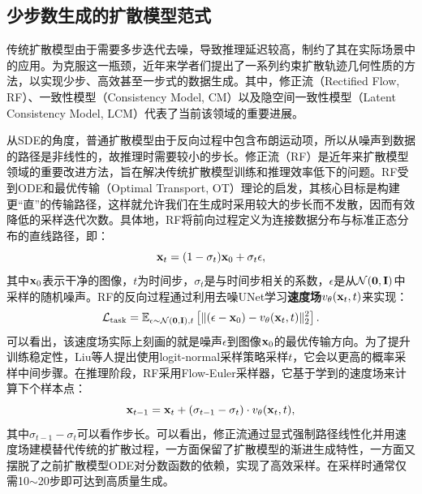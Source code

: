 \documentclass[11pt,a4paper,UTF8]{ctexart}
\begin{document}
\subsection{少步数生成的扩散模型范式}
\label{sec:rf_cm_lcm}

传统扩散模型由于需要多步迭代去噪，导致推理延迟较高，制约了其在实际场景中的应用。为克服这一瓶颈，近年来学者们提出了一系列约束扩散轨迹几何性质的方法，以实现少步、高效甚至一步式的数据生成。其中，修正流（Rectified Flow, RF）\cite{liu2022flow}、一致性模型（Consistency Model, CM）\cite{pmlr-v202-song23a}以及隐空间一致性模型（Latent Consistency Model, LCM）\cite{luo2023latent}代表了当前该领域的重要进展。


从SDE的角度，普通扩散模型由于反向过程中包含布朗运动项，所以从噪声到数据的路径是非线性的，故推理时需要较小的步长。修正流（RF）\cite{liu2022flow}是近年来扩散模型领域的重要改进方法，旨在解决传统扩散模型训练和推理效率低下的问题。RF受到ODE和最优传输（Optimal Transport, OT）理论的启发，其核心目标是构建更“直”的传输路径，这样就允许我们在生成时采用较大的步长而不发散，因而有效降低的采样迭代次数。具体地，RF将前向过程定义为连接数据分布与标准正态分布的直线路径，即：
\begin{equation*}
    \mathbf{x}_t = (1-\sigma_t)\mathbf{x}_0 + \sigma_t\epsilon,
\end{equation*}
其中$\mathbf{x}_0$表示干净的图像，$t$为时间步，$\sigma_t$是与时间步相关的系数，$\epsilon$是从$\mathcal{N}(\mathbf{0},\mathbf{I})$中采样的随机噪声。RF的反向过程通过利用去噪UNet学习\textbf{速度场}$v_\theta(\mathbf{x}_t,t)$来实现：
\begin{equation*}
    \mathcal{L}_{\text{task}} =\mathbb{E}_{\epsilon\sim\mathcal{N}(\mathbf{0},\mathbf{I}),t}\left[\|(\epsilon-\mathbf{x}_0) - v_\theta(\mathbf{x}_t,t)\|_2^2\right].
\end{equation*}
可以看出，该速度场实际上刻画的就是噪声$\epsilon$到图像$\mathbf{x}_0$的最优传输方向。为了提升训练稳定性，Liu等人\cite{liu2022flow}提出使用logit-normal采样策略采样$t$，它会以更高的概率采样中间步骤。在推理阶段，RF采用Flow-Euler采样器，它基于学到的速度场来计算下个样本点：
\begin{equation*}
    \mathbf{x}_{t-1} = \mathbf{x}_t + (\sigma_{t-1} - \sigma_t)\cdot v_\theta(\mathbf{x}_t,t),
\end{equation*}
其中$\sigma_{t-1} - \sigma_t$可以看作步长。可以看出，修正流通过显式强制路径线性化并用速度场建模替代传统的扩散过程，一方面保留了扩散模型的渐进生成特性，一方面又摆脱了之前扩散模型ODE对分数函数的依赖，实现了高效采样。在采样时通常仅需10$\sim$20步即可达到高质量生成。
\end{document}
